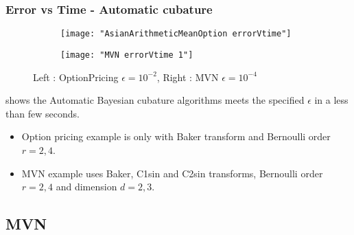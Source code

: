 \documentclass[10pt,compress,xcolor={usenames,dvipsnames}]{beamer} %
\newcommand{\errtol}{{\epsilon}}
\begin{document}
\begin{frame}
\frametitle{Error vs Time - Automatic cubature}
\vspace{-5ex}
\begin{figure}[htp]
\captionsetup[subfigure]{labelformat=empty}
\centering
\begin{subfigure}[b]{0.49\textwidth}
\texttt{[image: "AsianArithmeticMeanOption errorVtime"]}
\end{subfigure}
\centering
\begin{subfigure}[b]{0.49\textwidth}
\texttt{[image: "MVN errorVtime 1"]}
\end{subfigure}
\caption{ Left : OptionPricing $\errtol=10^{-2}$, Right : MVN $\errtol=10^{-4}$}
\end{figure}
\vspace{-3ex}
shows the Automatic Bayesian cubature algorithms meets the specified $\errtol$ in a less than few seconds.
\vspace{-3ex}
\begin{itemize}
\item
Option pricing example is only with Baker transform and Bernoulli order $r=2,4$.
\item
MVN example uses Baker, C1sin and C2sin transforms, Bernoulli order $r=2,4$ and dimension $d=2,3$.
\end{itemize}
\end{frame}












\subsection{MVN}


\iffalse
\frame{
\frametitle{Multivariate normal probability with fixed mean $m=0$}
\vspace{-5ex}
\begin{figure}[htp]
    \centering
    \begin{subfigure}[b]{0.34\textwidth}
    \texttt{[image: zeroMean/MVN/C1sin/"MVN Error d\_2 bernoulli\_2 Period\_C1sin"]}
    \end{subfigure}
    \centering
    \begin{subfigure}[b]{0.34\textwidth}
    \texttt{[image: zeroMean/MVN/C1sin/"MVN Error d\_3 bernoulli\_2 Period\_C1sin"]}
    \end{subfigure}
    \centering
    \begin{subfigure}[b]{0.34\textwidth}
    \texttt{[image: zeroMean/MVN/C1sin/"MVN Error d\_2 bernoulli\_4 Period\_C1sin"]}
    \end{subfigure}
    \centering
    \begin{subfigure}[b]{0.34\textwidth}
    \texttt{[image: zeroMean/MVN/C1sin/"MVN Error d\_3 bernoulli\_4 Period\_C1sin"]}
    \end{subfigure}
\end{figure}
}
\fi
\end{document}
